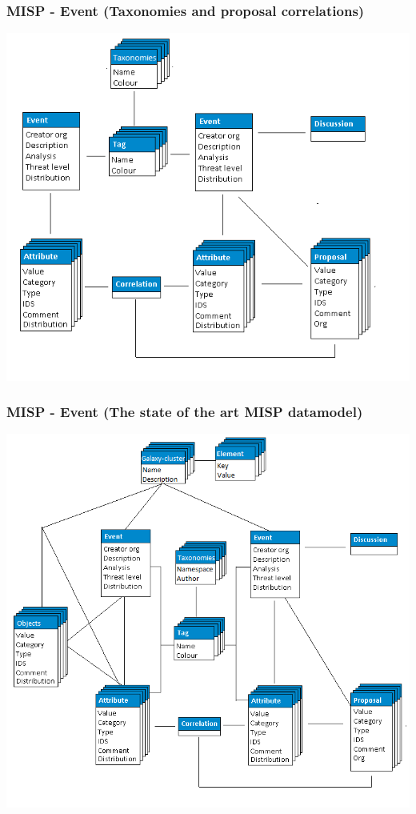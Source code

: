 \begin{frame}
    \frametitle{MISP - Event (Taxonomies and proposal correlations)}
    \includegraphics[scale=0.35]{screenshots/datamodel7.png}
\end{frame}

\begin{frame}
    \frametitle{MISP - Event (The state of the art MISP datamodel)}
    \includegraphics[scale=0.25]{screenshots/datamodel8.png}
\end{frame}

